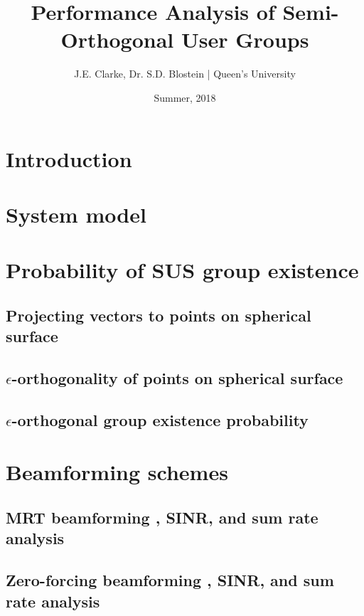 \documentclass[11pt]{article}
\title{Performance Analysis of Semi-Orthogonal User Groups}
\author{J.E. Clarke, Dr. S.D. Blostein | Queen's University}
\date{Summer, 2018}
\begin{document}
	\maketitle
	\newpage
	\section{Introduction}
	     
    \section{System model}
        
    \section{Probability of SUS group existence}
        \subsection{Projecting vectors to points on spherical surface}\label{sec:chan_norm}
            
        \subsection{$\epsilon$-orthogonality of points on spherical surface}\label{sec:spherical_caps}
            
            
        \subsection{$\epsilon$-orthogonal group existence probability}
            
            
    \section{Beamforming schemes}
        \subsection{MRT beamforming , SINR, and sum rate analysis}\label{sec:mrt_linear_sinr}
            
        \subsection{Zero-forcing beamforming , SINR, and sum rate analysis}\label{sec:zf_linear_sinr}
            
\end{document}
